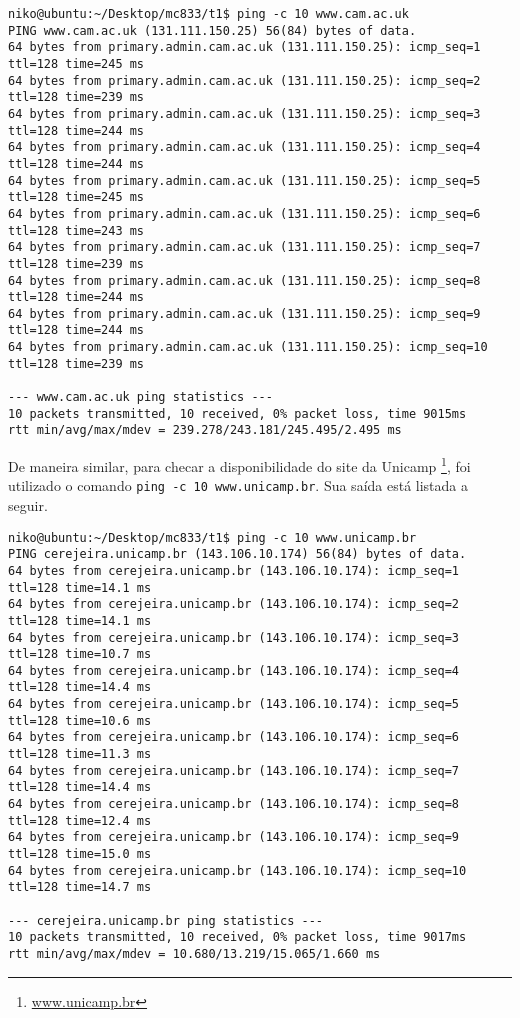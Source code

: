 \documentclass[a4paper,10pt]{article}
\begin{document}
\begin{lstlisting}
niko@ubuntu:~/Desktop/mc833/t1$ ping -c 10 www.cam.ac.uk
PING www.cam.ac.uk (131.111.150.25) 56(84) bytes of data.
64 bytes from primary.admin.cam.ac.uk (131.111.150.25): icmp_seq=1 ttl=128 time=245 ms
64 bytes from primary.admin.cam.ac.uk (131.111.150.25): icmp_seq=2 ttl=128 time=239 ms
64 bytes from primary.admin.cam.ac.uk (131.111.150.25): icmp_seq=3 ttl=128 time=244 ms
64 bytes from primary.admin.cam.ac.uk (131.111.150.25): icmp_seq=4 ttl=128 time=244 ms
64 bytes from primary.admin.cam.ac.uk (131.111.150.25): icmp_seq=5 ttl=128 time=245 ms
64 bytes from primary.admin.cam.ac.uk (131.111.150.25): icmp_seq=6 ttl=128 time=243 ms
64 bytes from primary.admin.cam.ac.uk (131.111.150.25): icmp_seq=7 ttl=128 time=239 ms
64 bytes from primary.admin.cam.ac.uk (131.111.150.25): icmp_seq=8 ttl=128 time=244 ms
64 bytes from primary.admin.cam.ac.uk (131.111.150.25): icmp_seq=9 ttl=128 time=244 ms
64 bytes from primary.admin.cam.ac.uk (131.111.150.25): icmp_seq=10 ttl=128 time=239 ms

--- www.cam.ac.uk ping statistics ---
10 packets transmitted, 10 received, 0% packet loss, time 9015ms
rtt min/avg/max/mdev = 239.278/243.181/245.495/2.495 ms
\end{lstlisting}

De maneira similar, para checar a disponibilidade do site da Unicamp \footnote{\url{www.unicamp.br}}, foi utilizado o comando {\tt ping -c 10 www.unicamp.br}. Sua saída está listada a seguir.\\

\begin{lstlisting}
niko@ubuntu:~/Desktop/mc833/t1$ ping -c 10 www.unicamp.br
PING cerejeira.unicamp.br (143.106.10.174) 56(84) bytes of data.
64 bytes from cerejeira.unicamp.br (143.106.10.174): icmp_seq=1 ttl=128 time=14.1 ms
64 bytes from cerejeira.unicamp.br (143.106.10.174): icmp_seq=2 ttl=128 time=14.1 ms
64 bytes from cerejeira.unicamp.br (143.106.10.174): icmp_seq=3 ttl=128 time=10.7 ms
64 bytes from cerejeira.unicamp.br (143.106.10.174): icmp_seq=4 ttl=128 time=14.4 ms
64 bytes from cerejeira.unicamp.br (143.106.10.174): icmp_seq=5 ttl=128 time=10.6 ms
64 bytes from cerejeira.unicamp.br (143.106.10.174): icmp_seq=6 ttl=128 time=11.3 ms
64 bytes from cerejeira.unicamp.br (143.106.10.174): icmp_seq=7 ttl=128 time=14.4 ms
64 bytes from cerejeira.unicamp.br (143.106.10.174): icmp_seq=8 ttl=128 time=12.4 ms
64 bytes from cerejeira.unicamp.br (143.106.10.174): icmp_seq=9 ttl=128 time=15.0 ms
64 bytes from cerejeira.unicamp.br (143.106.10.174): icmp_seq=10 ttl=128 time=14.7 ms

--- cerejeira.unicamp.br ping statistics ---
10 packets transmitted, 10 received, 0% packet loss, time 9017ms
rtt min/avg/max/mdev = 10.680/13.219/15.065/1.660 ms
\end{lstlisting}
\end{document}
